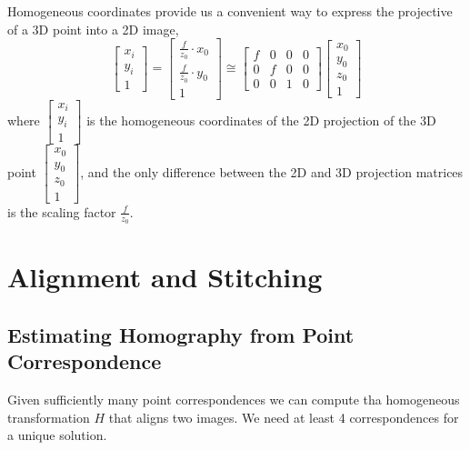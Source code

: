 Homogeneous coordinates provide us a convenient way to express the projective of a 3D point into a 2D image, \[
    \begin{bmatrix} x_i \\ y_i \\ 1 \end{bmatrix} = 
    \begin{bmatrix} \frac{f}{z_0} \cdot x_0 \\ \frac{f}{z_0} \cdot y_0 \\ 1 \end{bmatrix} \cong 
    \begin{bmatrix} f & 0 & 0 & 0 \\ 0 & f & 0 & 0 \\ 0 & 0 & 1 & 0 \end{bmatrix} 
    \begin{bmatrix} x_0 \\ y_0 \\ z_0 \\ 1 \end{bmatrix}
\] where $\begin{bmatrix} x_i \\ y_i \\ 1 \end{bmatrix}$ is the homogeneous coordinates of the 2D projection of the 3D point $\begin{bmatrix} x_0 \\ y_0 \\ z_0 \\ 1 \end{bmatrix}$, and the only difference between the 2D and 3D projection matrices is the scaling factor $\frac{f}{z_0}$.

\section{Alignment and Stitching}


\subsection{Estimating Homography from Point Correspondence}

\begin{claim}
    Given sufficiently many point correspondences we can compute tha homogeneous transformation $H$ that aligns two images. We need at least 4 correspondences for a unique solution. 
\end{claim} 

